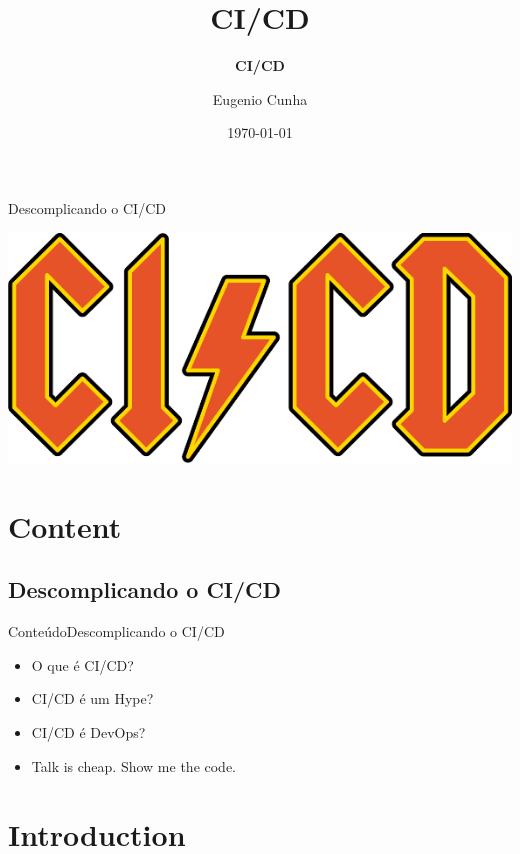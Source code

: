 \documentclass[10pt]{beamer}
\title[] %
{ %
      \textbf{CI/CD}
}
\subtitle[Descomplicando o CI/CD]
{
      \textbf{CI/CD}
}
\author[Eugenio Cunha]
{      Eugenio Cunha
      {}
}
\institute[]
{
      TWT Info
}
\date{\today}
\begin{document}




\begin{frame}{Descomplicando o CI/CD}{}
    \begin{center}
        \includegraphics[scale=0.3]{images/cicd}
    \end{center}
\end{frame}

\section{Content}

\subsection{Descomplicando o CI/CD}
\begin{frame}{Conteúdo}{Descomplicando o CI/CD}
  \begin{itemize}
    \item O que é CI/CD?
    \item CI/CD é um Hype?
    \item CI/CD é DevOps?
    \item Talk is cheap. Show me the code.
  \end{itemize}
\end{frame}

\section{Introduction}
\end{document}
